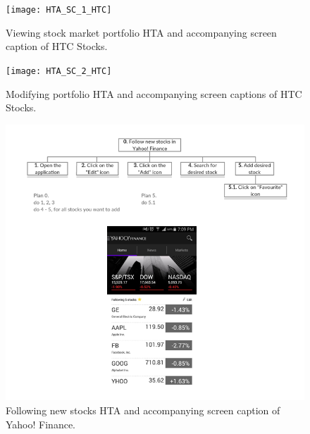 \documentclass{sigchi}
\begin{document}
\begin{figure}
	\begin{center}
		\texttt{[image: HTA\_SC\_1\_HTC]}
	\end{center}
	\caption{Viewing stock market portfolio HTA and accompanying screen caption of HTC Stocks.}
	\label{fig:figure5}
\end{figure}

\begin{figure}
	\begin{center}
		\texttt{[image: HTA\_SC\_2\_HTC]}
	\end{center}
	\caption{Modifying portfolio HTA and accompanying screen captions of HTC Stocks.}
	\label{fig:figure6}
\end{figure}

\begin{figure}
	\begin{center}
		\includegraphics[width=\textwidth]{HTA_SC_1_Yahoo}
	\end{center}
	\caption{Following new stocks HTA and accompanying screen caption of Yahoo! Finance.}
	\label{fig:figure7}
\end{figure}
\end{document}
